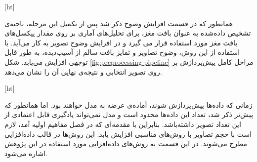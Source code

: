 
[ht]

همانطور که در قسمت افزایش وضوح ذکر شد پس از تکمیل این مرحله، ناحیه‌ی تشخیص داده‌شده به عنوان بافت مغز، برای تحلیل‌های آماری بر روی مقدار پیکسل‌های بافت مغز مورد استفاده قرار می گیرد و در افزایش وضوح تصویر به کار می‌آید.
با استفاده از این روش، وضوح تصاویر و تمایز بافت سالم از آسیب‌دیده، به طور قابل توجهی افزایش می‌یابد.
شکل \ref{fig:preprocessing-pipeline}
مراحل کامل پیش‌پردازش بر روی تصویر انتخابی و نتیجه‌ی نهایی آن را نشان می‌دهد.


[ht]



زمانی که داده‌ها پیش‌پردازش شوند، آماده‌ی عرضه به مدل خواهند بود.
اما همانطور که پیش‌تر ذکر شد، تعداد این داده‌ها محدود است و مدل نمی‌تواند یادگیری قابل اعتمادی از این تعداد تصویر داشته‌باشد.
بنابراین
 با مقدمه‌ای که در فصل مفاهیم اولیه آمد، لازم است با حجم تصاویر با روش‌های مناسبی افزایش یابد.
 این روش‌ها در قالب داده‌افزایی مطرح می‌شوند.
 در این قسمت به روش‌های داده‌افزایی مورد استفاده در این پژوهش اشاره می‌شود.\\

